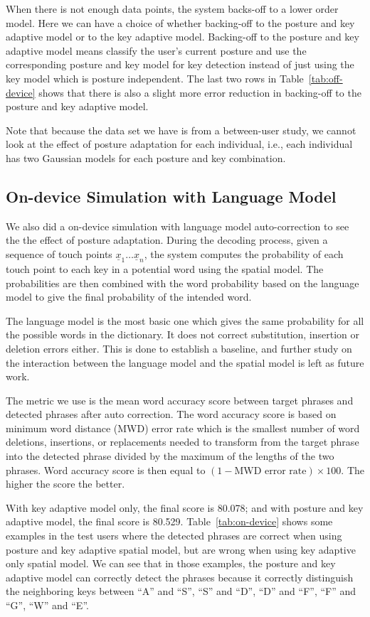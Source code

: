 \documentclass{sigchi}
\begin{document}
When there is not enough data points, the system backs-off to a lower order model.
Here we can have a choice of whether backing-off to the posture and key adaptive model or 
to the key adaptive model. Backing-off to the posture and key adaptive model means
classify the user's current posture and use the corresponding posture and key model for key detection instead
of just using the key model which is posture independent. The last two rows in 
Table~\ref{tab:off-device} shows that there is also a slight more error reduction  in backing-off to
the posture and key adaptive model.

Note that because the data set we have is from a between-user study, we cannot look
at the effect of posture adaptation for each individual, i.e., each individual has two Gaussian models
for each posture and key combination.

\subsection{On-device Simulation with Language Model}
We also did a on-device simulation with language model auto-correction to see the
the effect of posture adaptation. During the decoding process, given a sequence
of touch points $\underline x_1\ldots\underline x_n$, the system computes 
the probability of each touch point to
each key in a potential word using the spatial model.
The probabilities are then combined with the word probability based on the 
language model to give  the final probability of the intended word.

The language model is the most basic one which
gives the same probability for all the possible words in the dictionary. It does not
correct substitution, insertion or deletion errors either. This is done to establish
a baseline, and further study on the interaction between the language model and the spatial model 
is left as future work.

The metric we use is the mean word accuracy score between target phrases and detected
phrases after auto correction. The word accuracy score is based on minimum
word distance (MWD) error rate which is the smallest number of word deletions, insertions, or replacements needed to transform
from the target phrase into the detected phrase divided by the maximum of the 
lengths of the two phrases. Word accuracy score is then equal to $(1 - \text{MWD error rate})\times100$.
The higher the score the better.

With key adaptive model only, the final score is 80.078; and with posture and key
adaptive model, the final score is 80.529. Table~\ref{tab:on-device} shows some examples
in the test users where the detected phrases are correct when using posture and key adaptive spatial model, but
are wrong when using key adaptive only spatial model. We can see that in those examples,
the posture and key adaptive model can correctly detect the phrases because it
correctly distinguish the neighboring keys between ``A'' and ``S'', ``S'' and ``D'',
``D'' and ``F'', ``F'' and ``G'', ``W'' and ``E''. 
\end{document}
